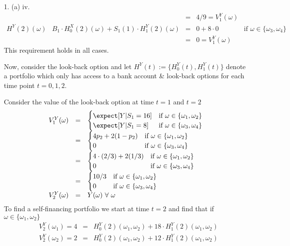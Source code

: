 \documentclass[11pt,a4paper]{article}
\begin{document}
\begin{answer}{1. (a) iv.}
\[\begin{array}{r|rclcll}
    &&=&4/9=V_1^Y(\omega)\\
    H^Y(2)(\omega)&B_1\cdot H_0^X(2)(\omega)+S_1(1)\cdot H_1^Y(2)(\omega)&=&0+8\cdot0&\text{if }\omega\in\{\omega_3,\omega_4\}\\
    &&=&0=V_1^Y(\omega)
  \end{array}\]
  This requirement holds in all cases.
  \vspace{5mm}
  \par Now, consider the look-back option and let $H^Y(t):=\{H_0^Y(t),H_1^Y(t)\}$ denote a portfolio which only has access to a bank account \& look-back options for each time point $t=0,1,2$.
  \par Consider the value of the look-back option at time $t=1$ and $t=2$
  \[\begin{array}{rcl}
    V_1^Y(\omega)&=&\begin{cases}
      \expect[Y|S_1=16]&\text{if }\omega\in\{\omega_1,\omega_2\}\\
      \expect[Y|S_1=8]&\text{if }\omega\in\{\omega_3,\omega_4\}
    \end{cases}\\
    &=&\begin{cases}
      4p_2+2(1-p_2)&\text{if }\omega\in\{\omega_1,\omega_2\}\\
      0&\text{if }\omega\in\{\omega_3,\omega_4\}
    \end{cases}\\
    &=&\begin{cases}
      4\cdot(2/3)+2(1/3)&\text{if }\omega\in\{\omega_1,\omega_2\}\\
      0&\text{if }\omega\in\{\omega_3,\omega_4\}
    \end{cases}\\
    &=&\begin{cases}
      10/3&\text{if }\omega\in\{\omega_1,\omega_2\}\\
      0&\text{if }\omega\in\{\omega_3,\omega_4\}
    \end{cases}\\
    V_2^Y(\omega)&=&Y(\omega)\ \forall\ \omega
  \end{array}\]
  To find a self-financing portfolio we start at time $t=2$ and find that if $\omega\in\{\omega_1,\omega_2\}$
  \[\begin{array}{rrcl}
    &V_2^Y(\omega_1)=4&=&H_0^Y(2)(\omega_1,\omega_2)+18\cdot H_1^Y(2)(\omega_1,\omega_2)\\
    &V_2^Y(\omega_2)=2&=&H_0^Y(2)(\omega_1,\omega_2)+12\cdot H_1^Y(2)(\omega_1,\omega_2)\\\\

\end{array}\]
\end{answer}
\end{document}
